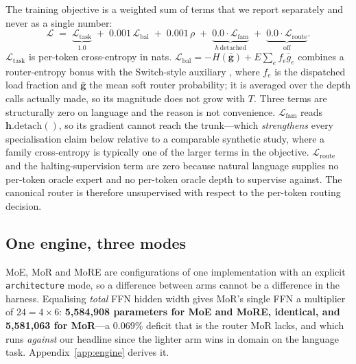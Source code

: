 The training objective is a weighted sum of terms that we report separately and
never as a single number:
{\dispsize
\begin{equation}
\mathcal{L} \;=\;
\underbrace{\mathcal{L}_{\text{task}}}_{1.0} \;+\;
0.001\,\mathcal{L}_{\text{bal}} \;+\;
0.001\,\rho \;+\;
\underbrace{0.0\cdot\mathcal{L}_{\text{fam}}}_{h\,\text{detached}} \;+\;
\underbrace{0.0\cdot\mathcal{L}_{\text{route}}}_{\text{off}} .
\label{eq:loss}
\end{equation}
}
$\mathcal{L}_{\text{task}}$ is per-token cross-entropy in nats.
$\mathcal{L}_{\text{bal}} = -H(\bar{\mathbf{g}}) + E\sum_e f_e \bar{g}_e$ combines
a router-entropy bonus with the Switch-style auxiliary \citep{fedus2022switch},
where $f_e$ is the dispatched load fraction and $\bar{\mathbf{g}}$ the mean soft
router probability; it is averaged over the depth calls actually made, so its
magnitude does not grow with $T$. Three terms are structurally zero on language
and the reason is not convenience. $\mathcal{L}_{\text{fam}}$ reads
$\mathbf{h}.\mathrm{detach}()$, so its gradient cannot reach the trunk---which
\emph{strengthens} every specialisation claim below relative to a comparable
synthetic study, where a family cross-entropy is typically one of the larger terms
in the objective. $\mathcal{L}_{\text{route}}$ and the halting-supervision term are
zero because natural language supplies no per-token oracle expert and no per-token
oracle depth to supervise against. The canonical router is therefore unsupervised
with respect to the per-token routing decision.

\subsection{One engine, three modes}\label{sec:engine} MoE, MoR and MoRE are configurations of one implementation with an explicit \texttt{architecture} mode, so a difference between arms cannot be a difference in the harness. Equalising \emph{total} FFN hidden width gives MoR's single FFN a multiplier of $24=4\times6$: \textbf{5{,}584{,}908 parameters for MoE and MoRE, identical, and 5{,}581{,}063 for MoR}---a $0.069\%$ deficit that is the router MoR lacks, and which runs \emph{against} our headline since the lighter arm wins in domain on the language task. Appendix~\ref{app:engine} derives it.
